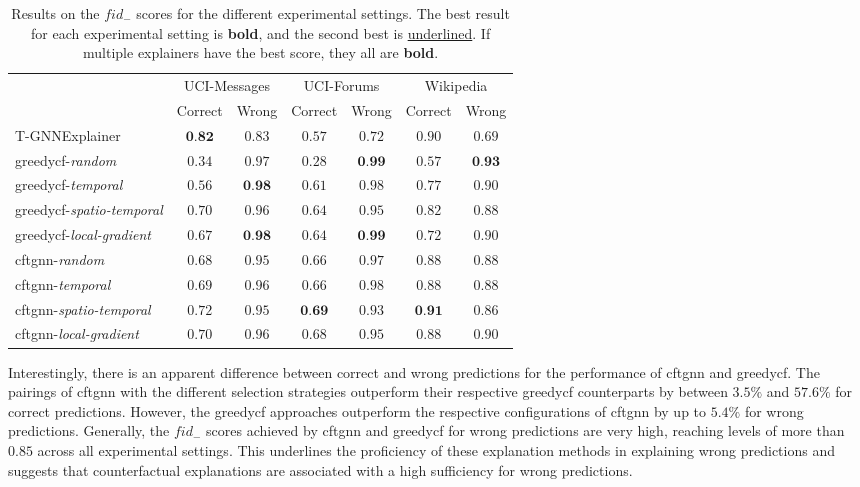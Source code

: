 \begin{table}[ht]
    \centering
    \small
    \begin{tabular}{lcccccc}
    \hline
         &  \multicolumn{2}{c}{UCI-Messages}&  \multicolumn{2}{c}{UCI-Forums}&  \multicolumn{2}{c}{Wikipedia}\\
         &  Correct&  Wrong&  Correct&  Wrong&  Correct& Wrong\\
         \hline
         T-GNNExplainer&  $\textbf{0.82}$&  $0.83$&  $0.57$&  $0.72$&  \underline{$0.90$}& $0.69$\\
         \gls{greedycf}-\textit{random}&  $0.34$&  $0.97$&  $0.28$&  $\textbf{0.99}$&  $0.57$& $\textbf{0.93}$\\
         \gls{greedycf}-\textit{temporal}&  $0.56$&  $\textbf{0.98}$&  $0.61$&  $0.98$&  $0.77$& $0.90$\\
         \gls{greedycf}-\textit{spatio-temporal}&  $0.70$&  $0.96$&  $0.64$&  $0.95$&  $0.82$& $0.88$\\
         \gls{greedycf}-\textit{local-gradient}&  $0.67$&  $\textbf{0.98}$&  $0.64$&  $\textbf{0.99}$&  $0.72$& $0.90$\\
         \gls{cftgnn}-\textit{random}&  $0.68$&  $0.95$&  $0.66$&  $0.97$&  $0.88$& $0.88$\\
         \gls{cftgnn}-\textit{temporal}&  $0.69$&  $0.96$&  $0.66$&  $0.98$&  $0.88$& $0.88$\\
         \gls{cftgnn}-\textit{spatio-temporal}&  \underline{$0.72$}&  $0.95$&  $\textbf{0.69}$&  $0.93$&  $\textbf{0.91}$& $0.86$\\
 \gls{cftgnn}-\textit{local-gradient}& $0.70$& $0.96$& \underline{$0.68$}& $0.95$& $0.88$&\underline{$0.90$}\\
 \hline
    \end{tabular}
    \caption{Results on the $fid_-$ scores for the different experimental settings. The best result for each experimental setting is \textbf{bold}, and the second best is \underline{underlined}. If multiple explainers have the best score, they all are \textbf{bold}.}
    \label{t_fid_minus}
\end{table}

Interestingly, there is an apparent difference between correct and wrong predictions for the performance of \gls{cftgnn} and \gls{greedycf}. The pairings of \gls{cftgnn} with the different selection strategies outperform their respective \gls{greedycf} counterparts by between $3.5\%$ and $57.6\%$ for correct predictions. However, the \gls{greedycf} approaches outperform the respective configurations of \gls{cftgnn} by up to $5.4\%$ for wrong predictions. Generally, the $fid_-$ scores achieved by \gls{cftgnn} and \gls{greedycf} for wrong predictions are very high, reaching levels of more than $0.85$ across all experimental settings. This underlines the proficiency of these explanation methods in explaining wrong predictions and suggests that counterfactual explanations are associated with a high sufficiency for wrong predictions.



